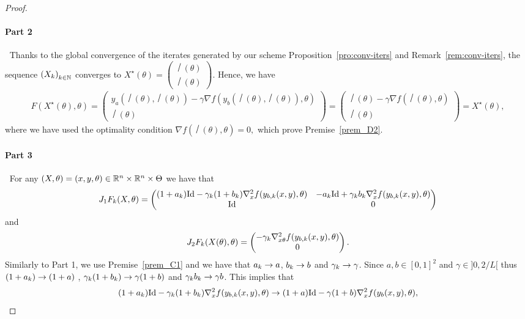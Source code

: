 \begin{appendices}
\begin{proof}
\paragraph{Part 2}\label{thm:gim-stable-part2}$~$
Thanks to the global convergence of the iterates generated by our scheme  Proposition~\ref{pro:conv-iters} and Remark~\ref{rem:conv-iters}, the sequence $\left(X_k\right)_{k\in\mathbb{N}}$ converges to $X^{\star}(\theta)=\begin{pmatrix}\xsol(\theta)\\\xsol(\theta)\end{pmatrix}.$ Hence, we have 
\begin{align*}
 F(X^{\star}(\theta),\theta)= \begin{pmatrix}
y_a(\xsol(\theta),\xsol(\theta))-\gamma\nabla f(y_b(\xsol(\theta),\xsol(\theta)),\theta)\\
\xsol(\theta)
\end{pmatrix}= \begin{pmatrix}
\xsol(\theta)-\gamma\nabla f(\xsol(\theta),\theta)\\
\xsol(\theta)
\end{pmatrix}=X^{\star}(\theta),
\end{align*}
where we have used the optimality condition $\nabla f(\xsol(\theta),\theta)=0,$ which prove Premise~\ref{prem_D2}.
\paragraph{Part 3}\label{thm:gim-stable-part3}$~$ For any $(X,\theta)=(x,y,\theta)\in\mathbb{R}^{n}\times\mathbb{R}^{n}\times\Theta$ we have that 
\[
	 	J_1F_k(X,\theta)= \begin{pmatrix} (1+a_{k})\mathrm{Id}-\gamma_{k}(1+b_{k})\nabla_x^2f(y_{b,k}(x,y),\theta) &-a_{k}\mathrm{Id}+\gamma_{k}b_{k}\nabla_x^2f(y_{b,k}(x,y),\theta) \\ \mathrm{Id}  & 
		0\end{pmatrix}
\]
and 
\[
		 	J_2F_k(X(\theta),\theta)= \begin{pmatrix} -\gamma_{k}\nabla_{x\theta}^2f(y_{b,k}(x,y),\theta)  \\  
		0\end{pmatrix}.
\]
Similarly to Part 1, we use Premise~\ref{prem_C1} and we have that $a_{k}\to a$, $b_{k}\to b$ and $\gamma_{k} \to \gamma$. Since $a,b\in[0,1]^2$ and $\gamma\in]0,2/L[$ thus  $(1+a_{k})\to(1+a)$ , $\gamma_{k}(1+b_{k})\to\gamma(1+b)$ and $\gamma_{k}b_{k}\to\gamma b$. This implies that
\[
 (1+a_{k})\mathrm{Id}-\gamma_{k}(1+b_{k})\nabla_x^2f(y_{b,k}(x,y),\theta)\to  (1+a)\mathrm{Id}-\gamma(1+b)\nabla_x^2f(y_b(x,y),\theta),
\]


\end{proof}
\end{appendices}
